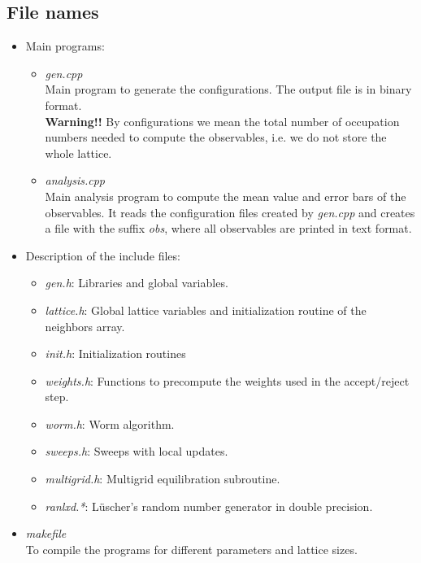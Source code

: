 \documentclass[a4paper,10pt]{report}
\begin{document}
\subsection*{File names}
\begin{itemize}[leftmargin=*]
 \item Main programs:
 \begin{itemize}[leftmargin=*]
  \item {\it gen.cpp}
  \\Main program to generate the configurations.  The output file is in binary format.
  \vspace*{2mm}
  \\{\bf Warning!!} By configurations we mean the total number of occupation numbers needed to compute 
  the observables, i.e. we do not store the whole lattice.
  
  \item {\it analysis.cpp}
  \\Main analysis program to compute the mean value and error bars of the observables.
  It reads the configuration files created by {\it gen.cpp} and creates a file with the suffix {\it obs}, where
  all observables are printed in text format.
 \end{itemize}
 
 \item Description of the include files:
 \begin{itemize}[leftmargin=*]
  \item {\it gen.h}: Libraries and global variables.
  \item {\it lattice.h}: Global lattice variables and initialization routine of the neighbors array.
  \item {\it init.h}: Initialization routines
  \item {\it weights.h}: Functions to precompute the weights used in the accept/reject step.
  \item {\it worm.h}: Worm algorithm.
  \item {\it sweeps.h}: Sweeps with local updates.
  \item {\it multigrid.h}: Multigrid equilibration subroutine.
  \item {\it ranlxd.*}: L\"uscher's random number generator in double precision.
 \end{itemize}

\item {\it makefile}
\\To compile the programs for different parameters and lattice sizes.
\end{itemize}
\end{document}
